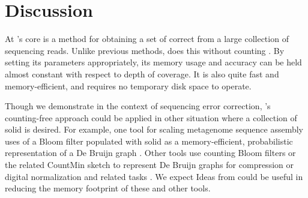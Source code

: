 \documentclass[10pt]{article}
\begin{document}
\section*{Discussion}
At \tool's core is a method for obtaining a set of correct \kmers from a large collection of sequencing reads.
Unlike previous methods, \tool does this without counting \kmers.
By setting its parameters appropriately, its memory usage and accuracy can be held almost constant with respect to depth of coverage.
It is also quite fast and memory-efficient, and requires no temporary disk space to operate.

Though we demonstrate \tool in the context of sequencing error correction, \tool's counting-free approach could be applied in other situation where a collection of solid \kmers is desired.
For example, one tool for scaling metagenome sequence assembly uses of a Bloom filter populated with solid \kmers as a memory-efficient, probabilistic representation of a De Bruijn graph \cite{pell2012scaling}.
Other tools use counting Bloom filters \cite{fan2000summary, bonomi2006improved} or the related CountMin sketch \cite{cormode2005improved} to represent De Bruijn graphs for compression \cite{jones2012compression} or digital normalization and related tasks \cite{zhang2013these}.
We expect Ideas from \tool could be useful in reducing the memory footprint of these and other tools. 




\end{document}
